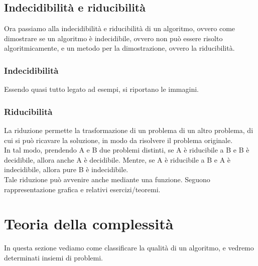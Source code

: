 \documentclass[]{article}
\begin{document}
		\subsection{Indecidibilità e riducibilità}
			Ora passiamo alla indecidibilità e riducibilità di un algoritmo, ovvero come dimostrare se un algoritmo è indecidibile, ovvero non può essere risolto algoritmicamente, e un metodo per la dimostrazione, ovvero la riducibilità.
			\subsubsection{Indecidibilità}
				Essendo quasi tutto legato ad esempi, si riportano le immagini.
				
			\subsubsection{Riducibilità}
				La riduzione permette la trasformazione di un problema di un altro problema, di cui si può ricavare la soluzione, in modo da risolvere il problema originale.\\
				In tal modo, prendendo A e B due problemi distinti, se A è riducibile a B e B è decidibile, allora anche A è decidibile. Mentre, se A è riducibile a B e A è indecidibile, allora pure B è indecidibile.\\
				Tale riduzione può avvenire anche mediante una funzione. Seguono rappresentazione grafica e relativi esercizi/teoremi.
				
	\section{Teoria della complessità}
		In questa sezione vediamo come classificare la qualità di un algoritmo, e vedremo determinati insiemi di problemi.
\end{document}
